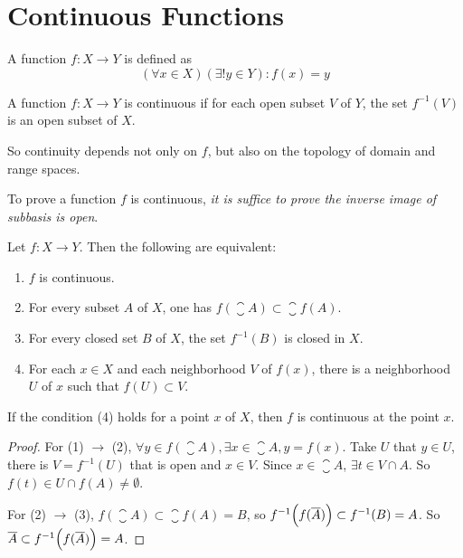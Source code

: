 \section{Continuous Functions}

\begin{definition}
    A function $f: X \rightarrow Y$ is defined as
    \begin{equation}
        (\forall x \in X) (\exists ! y \in Y): f(x) = y
    \end{equation}    
\end{definition}


\begin{definition}
    A function $f: X \rightarrow Y$ is continuous if for each open subset $V$ of $Y$, the set $f^{-1}(V)$ is an open subset of $X$.
    
    So continuity depends not only on $f$, but also on the topology of domain and range spaces.
\end{definition}

To prove a function $f$ is continuous, \emph{it is suffice to prove the inverse image of subbasis is open}.

\begin{theorem}
Let $f: X \rightarrow Y$. Then the following are equivalent:
\begin{enumerate}
    \item $f$ is continuous.
    \item For every subset $A$ of $X$, one has $f(\closure{A}) \subset \closure{f(A)}$.
    \item For every closed set $B$ of $X$, the set $f^{-1}(B)$ is closed in $X$.
    \item For each $x\in X$ and each neighborhood $V$ of $f(x)$, there is a neighborhood $U$ of $x$ such that $f(U) \subset V$.
\end{enumerate}    

If the condition (4) holds for a point $x$ of $X$, then $f$ is continuous at the point $x$.
\end{theorem}
\begin{proof}
    For (1) $\rightarrow$ (2), $\forall y \in f(\closure{A}), \exists x \in \closure{A}, y = f(x)$. Take $U$ that $y \in U$, there is $V = f^{-1}(U)$ that is open and $x \in V$. Since $x \in \closure{A}$, $\exists t \in V \cap A$. So $f(t) \in U \cap f(A) \neq \emptyset$.
    
    For (2) $\rightarrow$ (3), $f(\closure{A}) \subset \closure{f(A)} = B$, so $f^{-1} \mleft(f(\closure{A}) \mright) \subset f^{-1}(B) = A$. So $\closure{A} \subset f^{-1} \mleft(f(\closure{A}) \mright) = A$.
\end{proof}


